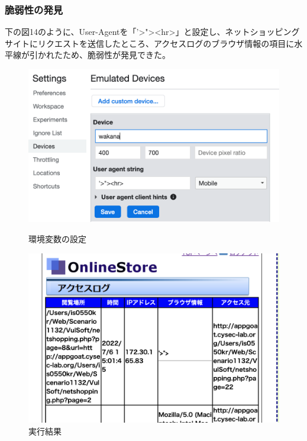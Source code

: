 \documentclass[dvipdfmx,autodetect-engine,titlepage]{jsarticle}
\begin{document}
\subsubsection{脆弱性の発見}
下の図14のように、User-Agentを「'\textgreater "\textgreater \textless hr\textgreater」と設定し、ネットショッピングサイトにリクエストを送信したところ、アクセスログのブラウザ情報の項目に水平線が引かれたため、脆弱性が発見できた。\\

\begin{figure}[H]
  \centering
  \begin{minipage}[b]{0.45\linewidth}
  \begin{center}
    \includegraphics[keepaspectratio,scale=0.35]{web14.png}
    \end{center}
    \caption{環境変数の設定}
  \end{minipage}
  \begin{minipage}[b]{0.45\linewidth}
  \begin{center}
    \includegraphics[keepaspectratio,scale=0.3]{web15.png}
    \end{center}
    \caption{実行結果}
  \end{minipage}
\end{figure}
\end{document}
